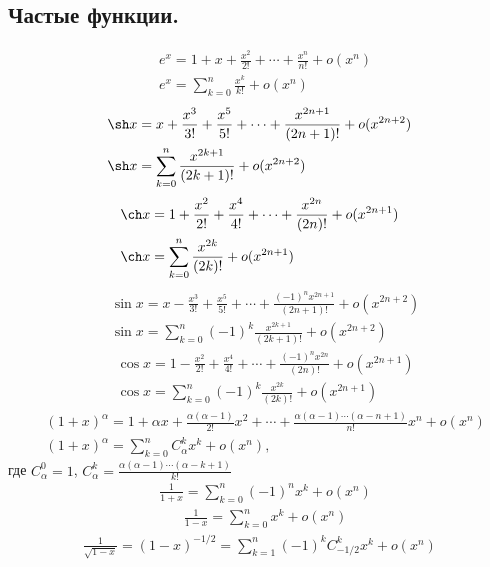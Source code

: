 \documentclass[a4paper,14pt]{article}
\begin{document}
    \subsection{Частые функции.}
    \begin{align}
        &e^x=1+x+\frac{x^2}{2!}+\cdots+\frac{x^n}{n!}+o(x^n) \nonumber \\
        &e^x=\sum_{k=0}^{n} \frac{x^k}{k!}+o(x^n)
    \end{align}
    \begin{align}
        &\sh x=x+\frac{x^3}{3!}+\frac{x^5}{5!}+\cdots+\frac{x^{2n+1}}{(2n+1)!}+o(x^{2n+2})\nonumber \\
        &\sh x=\sum_{k=0}^{n} \frac{x^{2k+1}}{(2k+1)!}+o(x^{2n+2})
    \end{align}
    \begin{align}
        &\ch x=1+\frac{x^2}{2!}+\frac{x^4}{4!}+\cdots+\frac{x^{2n}}{(2n)!}+o(x^{2n+1})\nonumber \\
        &\ch x=\sum_{k=0}^{n} \frac{x^{2k}}{(2k)!}+o(x^{2n+1})
    \end{align}
    \begin{align}
        &\sin x=x-\frac{x^3}{3!}+\frac{x^5}{5!}+\cdots+\frac{(-1)^nx^{2n+1}}{(2n+1)!}+o(x^{2n+2})\nonumber \\
        &\sin x=\sum_{k=0}^{n} (-1)^k \frac{x^{2k+1}}{(2k+1)!}+o(x^{2n+2})
    \end{align}
    \begin{align}
        &\cos x=1-\frac{x^2}{2!}+\frac{x^4}{4!}+\cdots+\frac{(-1)^nx^{2n}}{(2n)!}+o(x^{2n+1})\nonumber \\
        &\cos x=\sum_{k=0}^{n} (-1)^k \frac{x^{2k}}{(2k)!}+o(x^{2n+1})
    \end{align}
    \begin{align}
        &(1+x)^\alpha=1+\alpha x+\frac{\alpha(\alpha-1)}{2!}x^2+\cdots+\frac{\alpha(\alpha-1)\cdots(\alpha-n+1)}{n!}x^n+o(x^n)\nonumber \\
        &(1+x)^\alpha=\sum_{k=0}^{n} C_\alpha^kx^k+o(x^n),
    \end{align}
    где $C_\alpha^0=1$, $C_\alpha^k=\frac{\alpha(\alpha-1)\cdots(\alpha-k+1)}{k!}$
    \begin{align}
        &\frac{1}{1+x}=\sum_{k=0}^{n} (-1)^nx^k+o(x^n)
    \end{align}
    \begin{align}
        &\frac{1}{1-x}=\sum_{k=0}^{n} x^k+o(x^n)
    \end{align}
    \begin{align}
        \frac{1}{\sqrt{1-x}}=(1-x)^{-1/2}=\sum_{k=1}^{n} (-1)^k C_{-1/2}^{k}x^k+o(x^n)
    \end{align}
\end{document}
